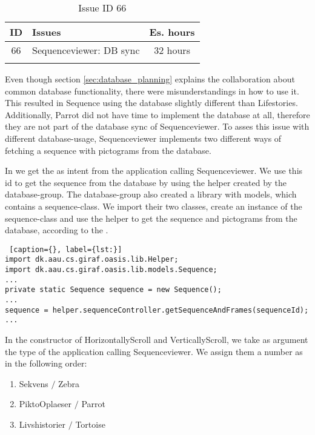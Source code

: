 \begin{longtable} { | c | p{12cm} | c | } 
\hline
	ID 	&	Issues	&		 Es. hours \\\hline
	 66	&	Sequenceviewer: DB sync	&	32 hours \\\hline
\caption{Issue ID 66}
\label{tab:spr4_SVdbSync}
\end{longtable}

Even though section \ref{sec:database_planning} explains the collaboration about common database functionality, there were misunderstandings in how to use it. This resulted in Sequence using the database slightly different than Lifestories. Additionally, Parrot did not have time to implement the database at all, therefore they are not part of the database sync of Sequenceviewer. To asses this issue with different database-usage, Sequenceviewer implements two different ways of fetching a sequence with pictograms from the database. 

In  we get the  as intent from the application calling Sequenceviewer. We use this id to get the sequence from the database by using the helper created by the database-group. The database-group also created a library with models, which contains a sequence-class. We import their two classes, create an instance of the sequence-class and use the helper to get the sequence and pictograms from the database, according to the .

\begin{lstlisting} [caption={}, label={lst:}]
import dk.aau.cs.giraf.oasis.lib.Helper;
import dk.aau.cs.giraf.oasis.lib.models.Sequence;
...
private static Sequence sequence = new Sequence();
...
sequence = helper.sequenceController.getSequenceAndFrames(sequenceId);
...
\end{lstlisting}

In the constructor of HorizontallyScroll and VerticallyScroll, we take as argument the type of the application calling Sequenceviewer. We assign them a number as in the following order:
\begin{enumerate}
\item Sekvens $/$ Zebra
\item PiktoOplaeser $/$ Parrot
\item Livshistorier $/$ Tortoise
\end{enumerate}

